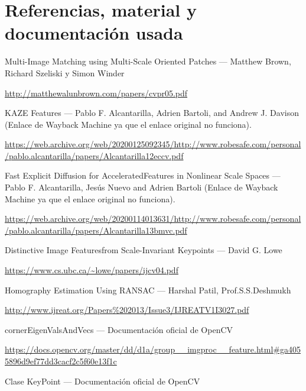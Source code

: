 \documentclass[12pt, spanish]{article}
\begin{document}
\newpage

\section{Referencias, material y documentación usada}


\begin{thebibliography}{9}


		Multi-Image Matching using Multi-Scale Oriented Patches --- Matthew Brown, Richard Szeliski y Simon Winder

		\url{http://matthewalunbrown.com/papers/cvpr05.pdf}


		KAZE Features --- Pablo F. Alcantarilla, Adrien Bartoli, and Andrew J. Davison (Enlace de Wayback Machine ya que el enlace original no funciona).

		\url{https://web.archive.org/web/20200125092345/http://www.robesafe.com/personal/pablo.alcantarilla/papers/Alcantarilla12eccv.pdf}


		Fast Explicit Diffusion for AcceleratedFeatures in Nonlinear Scale Spaces --- Pablo F. Alcantarilla, Jesús Nuevo and Adrien Bartoli (Enlace de Wayback Machine ya que el enlace original no funciona).

		\url{https://web.archive.org/web/20200114013631/http://www.robesafe.com/personal/pablo.alcantarilla/papers/Alcantarilla13bmvc.pdf}



		Distinctive Image Featuresfrom Scale-Invariant Keypoints --- David G. Lowe

		\url{https://www.cs.ubc.ca/~lowe/papers/ijcv04.pdf}


		Homography Estimation Using RANSAC --- Harshal Patil, Prof.S.S.Deshmukh

		\url{http://www.ijreat.org/Papers\%202013/Issue3/IJREATV1I3027.pdf}



		cornerEigenValsAndVecs --- Documentación oficial de OpenCV

		\url{https://docs.opencv.org/master/dd/d1a/group__imgproc__feature.html#ga4055896d9ef77dd3cacf2c5f60e13f1c}


		Clase KeyPoint --- Documentación oficial de OpenCV


\end{thebibliography}
\end{document}
